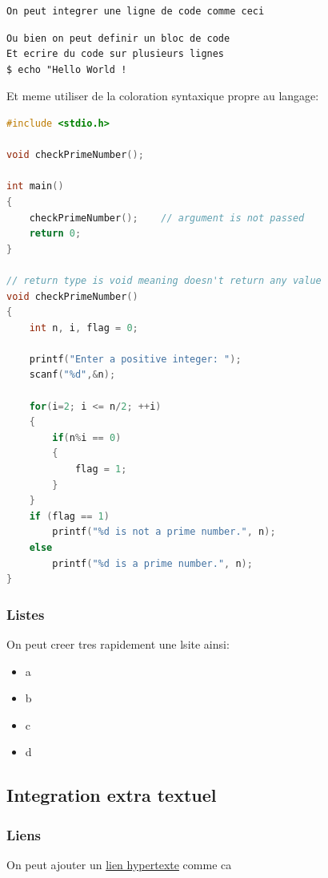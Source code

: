 \documentclass[11pt, a4paper]{article}
\begin{document}
\begin{lstlisting}
On peut integrer une ligne de code comme ceci
\end{lstlisting}

\begin{lstlisting}
Ou bien on peut definir un bloc de code
Et ecrire du code sur plusieurs lignes
$ echo "Hello World !
\end{lstlisting}

Et meme utiliser de la coloration syntaxique propre au langage:

\begin{lstlisting}[language=c]
#include <stdio.h>

void checkPrimeNumber();

int main()
{
    checkPrimeNumber();    // argument is not passed
    return 0;
}

// return type is void meaning doesn't return any value
void checkPrimeNumber()
{
    int n, i, flag = 0;

    printf("Enter a positive integer: ");
    scanf("%d",&n);

    for(i=2; i <= n/2; ++i)
    {
        if(n%i == 0)
        {
            flag = 1;
        }
    }
    if (flag == 1)
        printf("%d is not a prime number.", n);
    else
        printf("%d is a prime number.", n);
}
\end{lstlisting}

\subsubsection{Listes}

On peut creer tres rapidement une lsite ainsi:
\begin{itemize}
\item a\item b\item c\item d\end{itemize}
\subsection{Integration extra textuel}


\subsubsection{Liens}

On peut ajouter un 
\href{https://www.youtube.com/watch?v=dQw4w9WgXcQ}{lien hypertexte}
 comme ca
\end{document}
